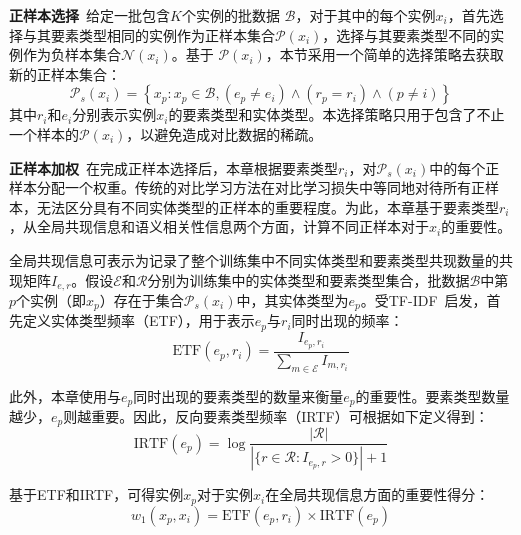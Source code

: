 \textbf{正样本选择}~给定一批包含$K$个实例的批数据 $\mathcal{B}$，对于其中的每个实例$x_{i}$，首先选择与其要素类型相同的实例作为正样本集合$\mathcal{P}\left(x_{i}\right)$，选择与其要素类型不同的实例作为负样本集合$\mathcal{N}\left(x_{i}\right)$。基于
$\mathcal{P}\left(x_{i}\right)$，本节采用一个简单的选择策略去获取新的正样本集合：
\begin{equation}
  \mathcal{P}_{s}\left(x_{i}\right)=\left\{x_{p}: x_{p} \in \mathcal{B}, (e_{p} \neq e_{i}) \wedge (r_{p}=r_{i}) \wedge (p \neq i)\right\}
\end{equation}
其中$r_{i}$和$e_{i}$分别表示实例$x_{i}$的要素类型和实体类型。本选择策略只用于包含了不止一个样本的$\mathcal{P}\left(x_{i}\right)$，以避免造成对比数据的稀疏。

\textbf{正样本加权}~在完成正样本选择后，本章根据要素类型$r_{i}$，对$\mathcal{P}_{s}\left(x_{i}\right)$中的每个正样本分配一个权重。传统的对比学习方法在对比学习损失中等同地对待所有正样本，无法区分具有不同实体类型的正样本的重要程度。为此，本章基于要素类型$r_{i}$，从全局共现信息和语义相关性信息两个方面，计算不同正样本对于$x_{i}$的重要性。

全局共现信息可表示为记录了整个训练集中不同实体类型和要素类型共现数量的共现矩阵$I_{e,r}$。假设$\mathcal{E}$和$\mathcal{R}$分别为训练集中的实体类型和要素类型集合，批数据$\mathcal{B}$中第$p$个实例（即$x_{p}$）存在于集合$\mathcal{P}_{s}\left(x_{i}\right)$中，其实体类型为$e_{p}$。受TF-IDF~\cite{salton1988term}启发，首先定义实体类型频率（ETF），用于表示$e_{p}$与$r_{i}$同时出现的频率：
\begin{equation}
  {\textrm{ETF}}\left(e_{p}, r_{i}\right)=\frac{I_{e_{p},r_{i}}}{\sum_{m \in \mathcal{E}} I_{m,r_{i}}}
\end{equation}

此外，本章使用与$e_{p}$同时出现的要素类型的数量来衡量$e_{p}$的重要性。要素类型数量越少，$e_{p}$则越重要。因此，反向要素类型频率（IRTF）可根据如下定义得到：
\begin{equation}
  {\textrm{IRTF}}\left(e_{p}\right)=\log \frac{|\mathcal{R}|}{|\{r \in \mathcal{R}: I_{e_{p},r} > 0\}|+1}
\end{equation}

基于ETF和IRTF，可得实例$x_{p}$对于实例$x_{i}$在全局共现信息方面的重要性得分：
\begin{equation}
 w_{1}\left(x_{p}, x_{i}\right)= {\textrm{ETF}}\left(e_{p}, r_{i}\right) \times {\textrm{IRTF}}\left(e_{p}\right)
\end{equation}

